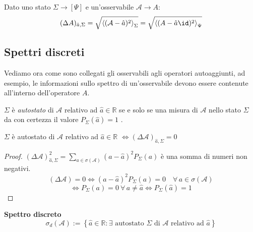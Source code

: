 \begin{remark}
    Dato uno stato \(\Sigma\to [\Psi]\) e un'osservabile \(\mathcal{A} \to A \):
   \begin{equation}
     (\Delta A )_{\hat{a}, \Sigma} = \sqrt{\expval{(\mathcal{A}-\hat{a})^2}_\Sigma}   = \sqrt{\expval{(A-\hat{a}\id)^2}_{\Psi}}
   \end{equation}
\end{remark}

\subsection{Spettri discreti}

Vediamo ora come sono collegati gli osservabili agli operatori autoaggiunti,
ad esempio, le informazioni sullo spettro di un'osservabile devono essere contenute all'interno dell'operatore \(A\).
\begin{definition}
    \(\Sigma\) è \textit{autostato} di \(\mathcal{A}\) relativo ad \(\hat{a}\in \mathbb{R}\) se e solo se una misura di \(\mathcal{A}\) nello stato
    \(\Sigma\) da con certezza il valore \(P_\Sigma(\hat{a})=1\) .
\end{definition}


\begin{theorem}
    \(\Sigma\) è autostato di \(\mathcal{A}\) relativo ad \(\hat{a} \in \mathbb{R}\)   \(\iff (\Delta \mathcal{A})_{\hat{a},\Sigma}=0\)
\end{theorem}
\begin{proof}
    \((\Delta \mathcal{A})^2_{\hat{a}, \Sigma} = \sum_{a \in \sigma(\mathcal{A})}(a-\hat{a})^2 P_{\Sigma}(a)\) è una somma di numeri non negativi.
    \[
        (\Delta\mathcal{A}) = 0 \iff (a- \hat{a})^2 P_\Sigma(a)= 0 \quad \forall \, a \in \sigma(\mathcal{A})
    \] 
    \[
        \iff P_\Sigma(a)= 0 \ \forall \, a \neq \hat{a}  \iff P_\Sigma(\hat{a})=1
    \]
\end{proof}

\begin{definition}  
    \textbf{Spettro discreto}
    \begin{equation}
        \sigma_d(\mathcal{A}):= \left\{ \hat{a} \in \mathbb{R} : \exists \text{ autostato } \Sigma \text{ di }\mathcal{A} \text{ relativo ad } \hat{a}\right\}
    \end{equation}
    
\end{definition}

